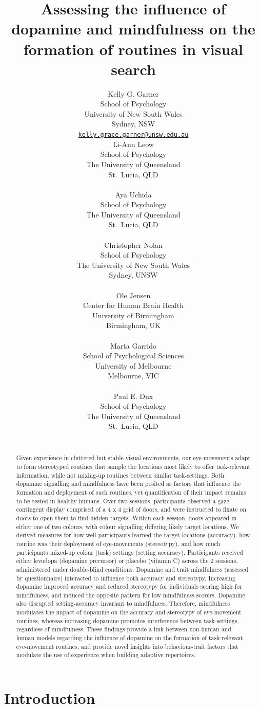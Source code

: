 \documentclass{article}
\title{Assessing the influence of dopamine and mindfulness on the
formation of routines in visual search}
\author{
    Kelly G. Garner
   \\
    School of Psychology \\
    University of New South Wales \\
  Sydney, NSW \\
  \texttt{\href{mailto:kelly.grace.garner@unsw.edu.au}{\nolinkurl{kelly.grace.garner@unsw.edu.au}}} \\
   \And
    Li-Ann Leow
   \\
    School of Psychology \\
    The University of Queensland \\
  St.~Lucia, QLD \\
  \texttt{} \\
   \And
    Aya Uchida
   \\
    School of Psychology \\
    The University of Queensland \\
  St.~Lucia, QLD \\
  \texttt{} \\
   \And
    Christopher Nolan
   \\
    School of Psychology \\
    The University of New South Wales \\
  Sydney, UNSW \\
  \texttt{} \\
   \And
    Ole Jensen
   \\
    Center for Human Brain Health \\
    University of Birmingham \\
  Birmingham, UK \\
  \texttt{} \\
   \And
    Marta Garrido
   \\
    School of Psychological Sciences \\
    University of Melbourne \\
  Melbourne, VIC \\
  \texttt{} \\
   \And
    Paul E. Dux
   \\
    School of Psychology \\
    The University of Queensland \\
  St.~Lucia, QLD \\
  \texttt{} \\
  }
\begin{document}
\maketitle


\begin{abstract}
Given experience in cluttered but stable visual environments, our
eye-movements adapt to form stereotyped routines that sample the
locations most likely to offer task-relevant information, while not
mixing-up routines between similar task-settings. Both dopamine
signalling and mindfulness have been posited as factors that influence
the formation and deployment of such routines, yet quantification of
their impact remains to be tested in healthy humans. Over two sessions,
participants observed a gaze contingent display comprised of a 4 x 4
grid of doors, and were instructed to fixate on doors to open them to
find hidden targets. Within each session, doors appeared in either one
of two colours, with colour signalling differing likely target
locations. We derived measures for how well participants learned the
target locations (accuracy), how routine was their deployment of
eye-movements (stereotypy), and how much participants mixed-up colour
(task) settings (setting accuracy). Participants received either
levodopa (dopamine precursor) or placebo (vitamin C) across the 2
sessions, administered under double-blind conditions. Dopamine and trait
mindfulness (assessed by questionnaire) interacted to influence both
accuracy and stereotypy. Increasing dopamine improved accuracy and
reduced stereotypy for individuals scoring high for mindfulness, and
induced the opposite pattern for low mindfulness scorers. Dopamine also
disrupted setting-accuracy invariant to mindfulness. Therefore,
mindfulness modulates the impact of dopamine on the accuracy and
stereotypy of eye-movement routines, whereas increasing dopamine
promotes interference between task-settings, regardless of mindfulness.
These findings provide a link between non-human and human models
regarding the influence of dopamine on the formation of task-relevant
eye-movement routines, and provide novel insights into behaviour-trait
factors that modulate the use of experience when building adaptive
repertoires.
\end{abstract}


\hypertarget{introduction}{%
\section{Introduction}\label{introduction}}
\end{document}
